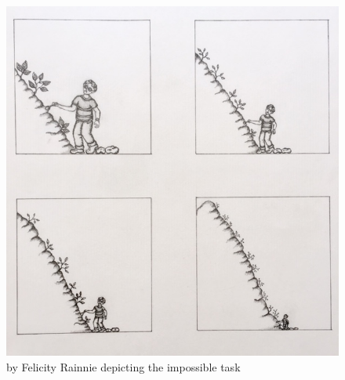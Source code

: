 \documentclass[11pt]{article}
\numberwithin{figure}{section}
\begin{document}
\begin{figure}[H]
\centering
\includegraphics[scale=0.6]{Flip_Cartoon.jpg}
\caption{by Felicity Rainnie depicting the impossible task}
\label{Figure:Flip_Cartoon.jpg}
\end{figure}
\end{document}
